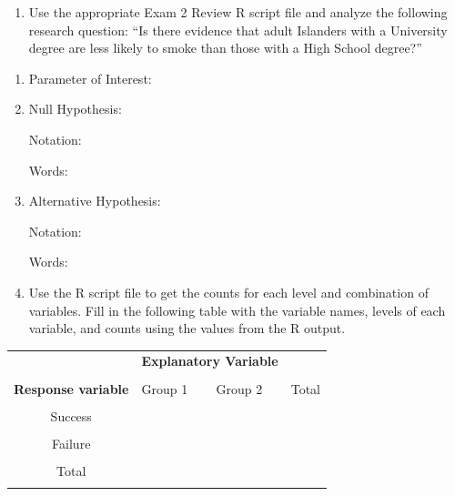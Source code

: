 \documentclass[
]{report}
\providecommand{\tightlist}{%
  \setlength{\itemsep}{0pt}\setlength{\parskip}{0pt}}
\begin{document}
\newpage

\begin{enumerate}
\def\labelenumi{\arabic{enumi}.}
\tightlist
\item
  Use the appropriate Exam 2 Review R script file and analyze the following research question: ``Is there evidence that adult Islanders with a University degree are less likely to smoke than those with a High School degree?''
\end{enumerate}

\begin{enumerate}
\def\labelenumi{\alph{enumi}.}
\item
  Parameter of Interest:
  \vspace{0.3in}
\item
  Null Hypothesis:

  Notation:
  \vspace{0.3in}

  Words:
  \vspace{0.5in}
\item
  Alternative Hypothesis:

  Notation:
  \vspace{0.3in}

  Words:
  \vspace{0.5in}
\item
  Use the R script file to get the counts for each level and combination of variables. Fill in the following table with the variable names, levels of each variable, and counts using the values from the R output.
\end{enumerate}

\begingroup
\setlength{\tabcolsep}{14pt}
\renewcommand{\arraystretch}{2}
\begin{center}
\begin{tabular}{|c|p{1in}|p{1in}|p{1in}|}
\hline
 & \multicolumn{2}{|c|}{\textbf{Explanatory Variable}} & \\ 
 & \multicolumn{2}{|c|}{ } & \\ \hline
\textbf{Response variable} & Group 1 & Group 2 & Total \\
 & & & \\ \hline
 Success & & & \\
 & & & \\ \hline
 Failure & & & \\
 & & & \\ \hline
 Total & & & \\
 & & & \\ \hline
\end{tabular}
\end{center}
\endgroup
\end{document}
